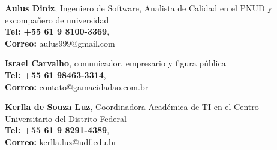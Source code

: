 
\textbf{Aulus Diniz}, Ingeniero de Software, Analista de Calidad en el PNUD y excompañero de universidad \\
\textbf{Tel: +55 61 9 8100-3369}, \\
\textbf{Correo:} aulus999@gmail.com

\divider

\textbf{Israel Carvalho}, comunicador, empresario y figura pública \\
\textbf{Tel: +55 61 98463-3314}, \\
\textbf{Correo:} contato@gamacidadao.com.br

\divider

\textbf{Kerlla de Souza Luz}, Coordinadora Académica de TI en el Centro Universitario del Distrito Federal \\
\textbf{Tel: +55 61 9 8291-4389}, \\
\textbf{Correo:} kerlla.luz@udf.edu.br
